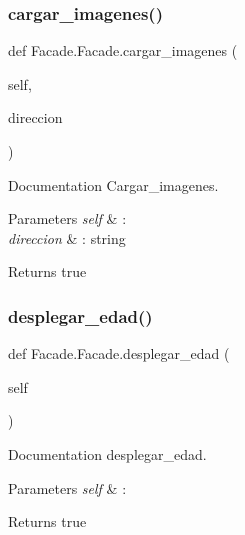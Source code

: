 \subsubsection{\texorpdfstring{cargar\+\_\+imagenes()}{cargar\_imagenes()}}
{\footnotesize\ttfamily def Facade.\+Facade.\+cargar\+\_\+imagenes (\begin{DoxyParamCaption}\item[{}]{self,  }\item[{}]{direccion }\end{DoxyParamCaption})}



Documentation Cargar\+\_\+imagenes. 


\begin{DoxyParams}{Parameters}
{\em self} & \+: \\
\hline
{\em direccion} & \+: string \\
\hline
\end{DoxyParams}
\begin{DoxyReturn}{Returns}
true 
\end{DoxyReturn}
\mbox{\label{class_facade_1_1_facade_a92d3a050a1526997ed8d0c080c016b77}} 
\subsubsection{\texorpdfstring{desplegar\+\_\+edad()}{desplegar\_edad()}}
{\footnotesize\ttfamily def Facade.\+Facade.\+desplegar\+\_\+edad (\begin{DoxyParamCaption}\item[{}]{self }\end{DoxyParamCaption})}



Documentation desplegar\+\_\+edad. 


\begin{DoxyParams}{Parameters}
{\em self} & \+: \\
\hline
\end{DoxyParams}
\begin{DoxyReturn}{Returns}
true 
\end{DoxyReturn}
\mbox{\label{class_facade_1_1_facade_a31c82e317bb43cffa46140c2826a908b}} 
